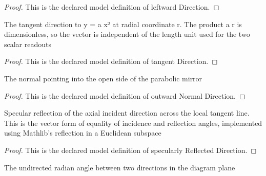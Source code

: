\begin{proof}
  This is the declared model definition of leftward Direction.
\end{proof}
\begin{definition}
  \label{def:physics:phyx-mini-0114:phyxminiproblems-problemphyxmini0114-tangentdirection}
  The tangent direction to y = a x² at radial coordinate r. The product a r is dimensionless, so the vector is independent of the length unit used for the two scalar readouts
\end{definition}
\begin{proof}
  This is the declared model definition of tangent Direction.
\end{proof}
\begin{definition}
  \label{def:physics:phyx-mini-0114:phyxminiproblems-problemphyxmini0114-outwardnormaldirection}
  The normal pointing into the open side of the parabolic mirror
\end{definition}
\begin{proof}
  This is the declared model definition of outward Normal Direction.
\end{proof}
\begin{definition}
  \label{def:physics:phyx-mini-0114:phyxminiproblems-problemphyxmini0114-specularlyreflecteddirection}
  Specular reflection of the axial incident direction across the local tangent line. This is the vector form of equality of incidence and reflection angles, implemented using Mathlib's reflection in a Euclidean subspace
\end{definition}
\begin{proof}
  This is the declared model definition of specularly Reflected Direction.
\end{proof}
\begin{definition}
  \label{def:physics:phyx-mini-0114:phyxminiproblems-problemphyxmini0114-anglebetweendirections}
  The undirected radian angle between two directions in the diagram plane
\end{definition}
